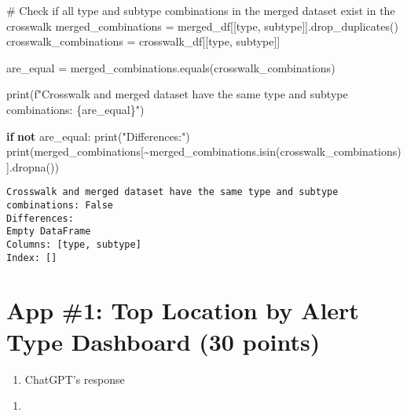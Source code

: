 \documentclass[
  letterpaper,
  DIV=11,
  numbers=noendperiod]{scrartcl}
\newenvironment{Shaded}{\begin{snugshade}}{\end{snugshade}}
\newcommand{\BuiltInTok}[1]{\textcolor[rgb]{0.00,0.23,0.31}{#1}}
\newcommand{\CommentTok}[1]{\textcolor[rgb]{0.37,0.37,0.37}{#1}}
\newcommand{\ControlFlowTok}[1]{\textcolor[rgb]{0.00,0.23,0.31}{\textbf{#1}}}
\newcommand{\KeywordTok}[1]{\textcolor[rgb]{0.00,0.23,0.31}{\textbf{#1}}}
\newcommand{\NormalTok}[1]{\textcolor[rgb]{0.00,0.23,0.31}{#1}}
\newcommand{\OperatorTok}[1]{\textcolor[rgb]{0.37,0.37,0.37}{#1}}
\newcommand{\SpecialCharTok}[1]{\textcolor[rgb]{0.37,0.37,0.37}{#1}}
\newcommand{\SpecialStringTok}[1]{\textcolor[rgb]{0.13,0.47,0.30}{#1}}
\newcommand{\StringTok}[1]{\textcolor[rgb]{0.13,0.47,0.30}{#1}}
\providecommand{\tightlist}{%
  \setlength{\itemsep}{0pt}\setlength{\parskip}{0pt}}\usepackage{longtable,booktabs,array}
\begin{document}
\begin{Shaded}
\begin{Highlighting}[]
\CommentTok{\# Check if all type and subtype combinations in the merged dataset exist in the crosswalk}
\NormalTok{merged\_combinations }\OperatorTok{=}\NormalTok{ merged\_df[[}\StringTok{\textquotesingle{}type\textquotesingle{}}\NormalTok{, }\StringTok{\textquotesingle{}subtype\textquotesingle{}}\NormalTok{]].drop\_duplicates()}
\NormalTok{crosswalk\_combinations }\OperatorTok{=}\NormalTok{ crosswalk\_df[[}\StringTok{\textquotesingle{}type\textquotesingle{}}\NormalTok{, }\StringTok{\textquotesingle{}subtype\textquotesingle{}}\NormalTok{]]}

\NormalTok{are\_equal }\OperatorTok{=}\NormalTok{ merged\_combinations.equals(crosswalk\_combinations)}

\BuiltInTok{print}\NormalTok{(}\SpecialStringTok{f"Crosswalk and merged dataset have the same type and subtype combinations: }\SpecialCharTok{\{}\NormalTok{are\_equal}\SpecialCharTok{\}}\SpecialStringTok{"}\NormalTok{)}

\ControlFlowTok{if} \KeywordTok{not}\NormalTok{ are\_equal:}
    \BuiltInTok{print}\NormalTok{(}\StringTok{"Differences:"}\NormalTok{)}
    \BuiltInTok{print}\NormalTok{(merged\_combinations[}\OperatorTok{\textasciitilde{}}\NormalTok{merged\_combinations.isin(crosswalk\_combinations)].dropna())}
\end{Highlighting}
\end{Shaded}

\begin{verbatim}
Crosswalk and merged dataset have the same type and subtype combinations: False
Differences:
Empty DataFrame
Columns: [type, subtype]
Index: []
\end{verbatim}

\section*{App \#1: Top Location by Alert Type Dashboard (30
points)}\label{app-1-top-location-by-alert-type-dashboard-30-points}

\begin{enumerate}
\def\labelenumi{\arabic{enumi}.}
\tightlist
\item
  ChatGPT's response
\end{enumerate}

\begin{enumerate}
\def\labelenumi{\alph{enumi}.}
\tightlist
\item
\end{enumerate}
\end{document}
